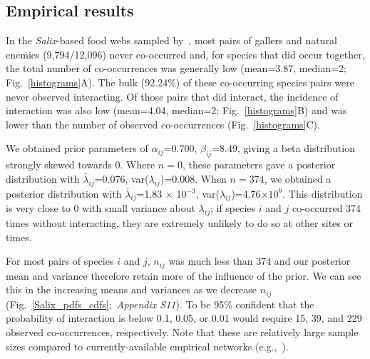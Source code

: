 \documentclass[12pt]{article}
\begin{document}
\begin{spacing}{2.0}
\subsection*{Empirical results}

  In the \emph{Salix}-based food webs sampled by~\citet{Kopelke2017}, most pairs of gallers and natural enemies (9,794/12,096) never co-occurred and, for species that did occur together, the total number of co-occurrences was generally low (mean=3.87, median=2; Fig.~\ref{histograms}A). The bulk (92.24\%) of these co-occurring species pairs were never observed interacting. Of those pairs that did interact, the incidence of interaction was also low (mean=4.04, median=2; Fig.~\ref{histograms}B) and was lower than the number of observed co-occurrences (Fig.~\ref{histograms}C).


  We obtained prior parameters of $\alpha_{ij}$=0.700, $\beta_{ij}$=8.49, giving a beta distribution strongly skewed towards 0. Where $n=0$, these parameters gave a posterior distribution with $\bar\lambda_{ij}$=0.076, var($\lambda_{ij}$)=0.008. When $n=374$, we obtained a posterior distribution with $\bar\lambda_{ij}$=1.83 $\times$ 10$^{-3}$, var($\lambda_{ij}$)=4.76$\times10^6$. This distribution is very close to 0 with small variance about $\lambda_{ij}$; if species $i$ and $j$ co-occurred 374 times without interacting, they are extremely unlikely to do so at other sites or times. 


  For most pairs of species $i$ and $j$, $n_{ij}$ was much less than 374 and our posterior mean and variance therefore retain more of the influence of the prior. We can see this in the increasing means and variances as we decrease $n_{ij}$ (Fig.~\ref{Salix_pdfs_cdfs};~\emph{Appendix S11}). To be 95\% confident that the probability of interaction is below 0.1, 0.05, or 0.01 would require 15, 39, and 229 observed co-occurrences, respectively. Note that these are relatively large sample sizes compared to currently-available empirical networks (e.g.,~\citealp{Morris2014}).




\end{spacing}
\end{document}
